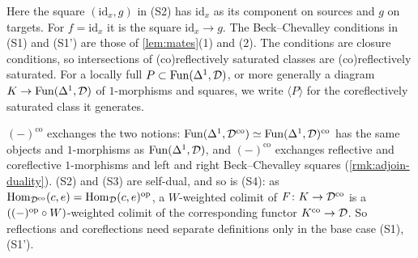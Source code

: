 %
Here the square $(\mathrm{id}_{x},g)$ in (S2) has $\mathrm{id}_{x}$ as its
component on sources and $g$ on targets.
For $f = \mathrm{id}_{x}$ it is the square
$\mathrm{id}_{x} \to g$.
The Beck--Chevalley conditions in (S1) and (S1') are those of
\cref{lem:mates}(1) and (2).
The conditions are closure conditions, so intersections of (co)reflectively
saturated classes are (co)reflectively saturated. For a locally full
$P \subset \operatorname{Fun}(\Delta^{1},\mathcal{D})$,
or more generally a diagram
$K \to \operatorname{Fun}(\Delta^{1},\mathcal{D})$
of $1$-morphisms and squares, we write $\langle P \rangle$ for the
coreflectively saturated class it generates.

%
$(-)^{\mathrm{co}}$ exchanges the two notions:
$\operatorname{Fun}(\Delta^{1},\mathcal{D}^{\mathrm{co}}) \simeq \operatorname{Fun}(\Delta^{1},\mathcal{D})^{\mathrm{co}}$
has the same objects and $1$-morphisms as $\operatorname{Fun}(\Delta^{1},\mathcal{D})$,
and $(-)^{\mathrm{co}}$ exchanges reflective and coreflective $1$-morphisms and
left and right Beck--Chevalley squares (\cref{rmk:adjoin-duality}).
(S2) and (S3) are self-dual, and so is (S4): as
$\operatorname{Hom}_{\mathcal{D}^{\mathrm{co}}}(c,e) = \operatorname{Hom}_{\mathcal{D}}(c,e)^{\mathrm{op}}$,
a $W$-weighted colimit of
$F\colon K \to \mathcal{D}^{\mathrm{co}}$
is a $((-)^{\mathrm{op}} \circ W)$-weighted colimit of the corresponding functor
$K^{\mathrm{co}} \to \mathcal{D}$.
So reflections and coreflections need separate definitions only in the base case
(S1), (S1').

